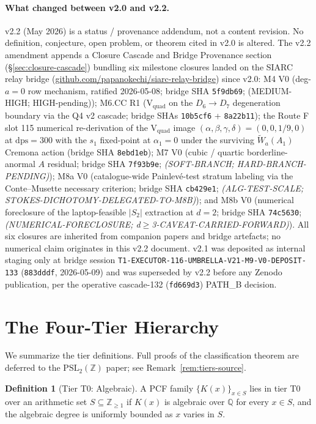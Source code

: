 \documentclass[11pt,a4paper]{article}
\theoremstyle{definition}
\newtheorem{definition}[conjecture]{Definition}
\theoremstyle{remark}
\newcommand{\PSLZ}{\mathrm{PSL}_2(\mathbb{Z})}
\newcommand{\Q}{\mathbb{Q}}
\newcommand{\Z}{\mathbb{Z}}
\begin{document}
\paragraph{What changed between v2.0 and v2.2.}
\label{par:v20-to-v22}
v2.2 (May 2026) is a status / provenance addendum, not a content
revision. No definition, conjecture, open problem, or theorem cited
in v2.0 is altered. The v2.2 amendment appends a Closure Cascade and
Bridge Provenance section (\S\ref{sec:closure-cascade}) bundling
six milestone closures landed on the SIARC relay bridge
(\href{https://github.com/papanokechi/siarc-relay-bridge}{github.com/papanokechi/siarc-relay-bridge})
since v2.0:
M4 V0 (deg-$a=0$ row mechanism, ratified 2026-05-08;
bridge SHA \texttt{5f9db69}; (MEDIUM-HIGH; HIGH-pending));
M6.CC R1 (V$_{\mathrm{quad}}$ on the
$D_6 \to D_7$ degeneration boundary via the Q4 v2 cascade; bridge SHAs
\texttt{10b5cf6} + \texttt{8a22b11});
the Route F slot 115 numerical re-derivation of the V$_{\mathrm{quad}}$
image $(\alpha,\beta,\gamma,\delta) = (0,0,1/9,0)$ at $\mathrm{dps}=300$
with the $s_1$ fixed-point at $\alpha_1 = 0$ under the surviving
$\widetilde{W}_a(A_1)$ Cremona action (bridge SHA \texttt{8ebd1eb});
M7 V0 (cubic / quartic borderline-anormal $A$ residual; bridge SHA
\texttt{7f93b9e}; \emph{(SOFT-BRANCH; HARD-BRANCH-PENDING)});
M8a V0 (catalogue-wide Painlev\'e-test stratum labeling via the
Conte--Musette necessary criterion; bridge SHA \texttt{cb429e1};
\emph{(ALG-TEST-SCALE; STOKES-DICHOTOMY-DELEGATED-TO-M8B)});
and M8b V0 (numerical foreclosure of the laptop-feasible $|S_2|$
extraction at $d=2$; bridge SHA \texttt{74c5630};
\emph{(NUMERICAL-FORECLOSURE; d$\geq$3-CAVEAT-CARRIED-FORWARD)}).
All six closures are inherited from companion papers and bridge
artefacts; no numerical claim originates in this v2.2 document.
v2.1 was deposited as internal staging only at bridge session
\texttt{T1-EXECUTOR-116-UMBRELLA-V21-M9-V0-DEPOSIT-133}
(\texttt{883dddf}, 2026-05-09) and was superseded by v2.2 before any
Zenodo publication, per the operative cascade-132 (\texttt{fd669d3})
PATH\_B decision.

\section{The Four-Tier Hierarchy}
\label{sec:tiers}

We summarize the tier definitions. Full proofs of the classification
theorem are deferred to the $\PSLZ$ paper; see Remark~\ref{rem:tiers-source}.

\begin{definition}[Tier T0: Algebraic]
A PCF family $\{K(x)\}_{x \in S}$ lies in tier T0 over an arithmetic set
$S \subseteq \Z_{\geq 1}$ if $K(x)$ is algebraic over $\Q$ for every
$x \in S$, and the algebraic degree is uniformly bounded as $x$ varies in $S$.
\end{definition}
\end{document}
